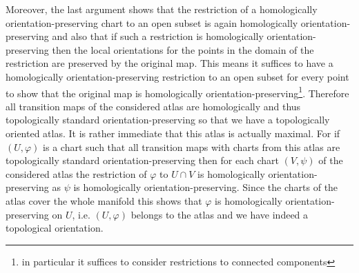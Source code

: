 \begin{prf}
\begin{enumerate}
Moreover, the last argument shows that the restriction of a homologically orientation-preserving chart to an open subset is again homologically orientation-preserving and also that if such a restriction is homologically orientation-preserving then the local orientations for the points in the domain of the restriction are preserved by the original map. This means it suffices to have a homologically orientation-preserving restriction to an open subset for every point to show that the original map is homologically orientation-preserving\footnote{in particular it suffices to consider restrictions to connected components}. Therefore all transition maps of the considered atlas are homologically and thus topologically standard orientation-preserving so that we have a topologically oriented atlas. It is rather immediate that this atlas is actually maximal. For if $(U,\varphi)$ is a chart such that all transition maps with charts from this atlas are topologically standard orientation-preserving then for each chart $(V,\psi)$ of the considered atlas the restriction of $\varphi$ to $U \cap V$ is homologically orientation-preserving as $\psi$ is homologically orientation-preserving. Since the charts of the atlas cover the whole manifold this shows that $\varphi$ is homologically orientation-preserving on $U$, i.e. $(U,\varphi)$ belongs to the atlas and we have indeed a topological orientation.


\end{enumerate}
\end{prf}
